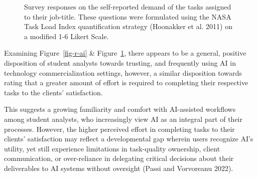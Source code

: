 \documentclass[
]{article}
\begin{document}
\begin{figure}


\caption{\label{fig-r-task}Survey responses on the self-reported demand
of the tasks assigned to their job-title. These questions were
formulated using the NASA Task Load Index quantification strategy
(Hoonakker et al. 2011) on a modified 1-6 Likert Scale.}

\end{figure}%

Examining Figure~\ref{fig-r-ai} \& Figure~\ref{fig-r-task}, there
appears to be a general, positive disposition of student analysts
towards trusting, and frequently using AI in technology
commercialization settings, however, a similar disposition towards
rating that a greater amount of effort is required to completing their
respective tasks to the clients' satisfaction.

This suggests a growing familiarity and comfort with AI-assisted
workflows among student analysts, who increasingly view AI as an
integral part of their processes. However, the higher perceived effort
in completing tasks to their clients' satisfaction may reflect a
developmental gap wherein users recognize AI's utility, yet still
experience limitations in task-quality ownership, client communication,
or over-reliance in delegating critical decisions about their
deliverables to AI systems without oversight (Passi and Vorvoreanu
2022).
\end{document}
